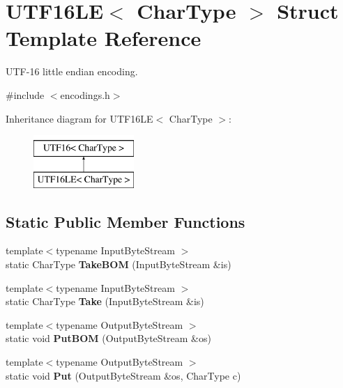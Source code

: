 \hypertarget{structUTF16LE}{}\section{U\+T\+F16\+LE$<$ Char\+Type $>$ Struct Template Reference}
\label{structUTF16LE}


U\+T\+F-\/16 little endian encoding.  




{\ttfamily \#include $<$encodings.\+h$>$}

Inheritance diagram for U\+T\+F16\+LE$<$ Char\+Type $>$\+:\begin{figure}[H]
\begin{center}
\leavevmode
\includegraphics[height=2.000000cm]{structUTF16LE}
\end{center}
\end{figure}
\subsection*{Static Public Member Functions}
\begin{DoxyCompactItemize}
\item 
{\footnotesize template$<$typename Input\+Byte\+Stream $>$ }\\static Char\+Type {\bfseries Take\+B\+OM} (Input\+Byte\+Stream \&is)\hypertarget{structUTF16LE_ab1d5f43903815155796733f76b21deea}{}\label{structUTF16LE_ab1d5f43903815155796733f76b21deea}

\item 
{\footnotesize template$<$typename Input\+Byte\+Stream $>$ }\\static Char\+Type {\bfseries Take} (Input\+Byte\+Stream \&is)\hypertarget{structUTF16LE_a5927b3d75ff9ce02056d827c14bd0160}{}\label{structUTF16LE_a5927b3d75ff9ce02056d827c14bd0160}

\item 
{\footnotesize template$<$typename Output\+Byte\+Stream $>$ }\\static void {\bfseries Put\+B\+OM} (Output\+Byte\+Stream \&os)\hypertarget{structUTF16LE_a6bfd05f8cac35c1594c7fce47009f198}{}\label{structUTF16LE_a6bfd05f8cac35c1594c7fce47009f198}

\item 
{\footnotesize template$<$typename Output\+Byte\+Stream $>$ }\\static void {\bfseries Put} (Output\+Byte\+Stream \&os, Char\+Type c)\hypertarget{structUTF16LE_ac018cc43a1dba5a6ca232bd9a257072c}{}\label{structUTF16LE_ac018cc43a1dba5a6ca232bd9a257072c}

\end{DoxyCompactItemize}
